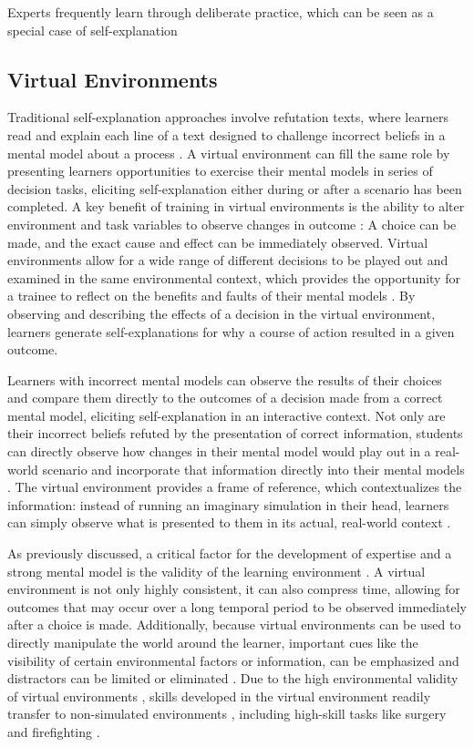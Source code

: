 Experts frequently learn through deliberate practice, which can be seen as a special case of self-explanation

\subsection{Virtual Environments}

Traditional self-explanation approaches involve refutation texts, where learners read and explain each line of a text designed to challenge incorrect beliefs in a mental model about a process \citep{Chi1994}. A virtual environment can fill the same role by presenting learners opportunities to exercise their mental models in series of decision tasks, eliciting self-explanation either during or after a scenario has been completed. A key benefit of training in virtual environments is the ability to alter environment and task variables to observe changes in outcome \citep{Klein2006}: A choice can be made, and the exact cause and effect can be immediately observed. Virtual environments allow for a wide range of different decisions to be played out and examined in the same environmental context, which provides the opportunity for a trainee to reflect on the benefits and faults of their mental models \citep{Salzman1999}. By observing and describing the effects of a decision in the virtual environment, learners generate self-explanations for why a course of action resulted in a given outcome.

Learners with incorrect mental models can observe the results of their choices and compare them directly to the outcomes of a decision made from a correct mental model, eliciting self-explanation in an interactive context. Not only are their incorrect beliefs refuted by the presentation of correct information, students can directly observe how changes in their mental model would play out in a real-world scenario and incorporate that information directly into their mental models \citep{Salzman1999}. The virtual environment provides a frame of reference, which contextualizes the information: instead of running an imaginary simulation in their head, learners can simply observe what is presented to them in its actual, real-world context \citep{Ericsson1993}.

As previously discussed, a critical factor for the development of expertise and a strong mental model is the validity of the learning environment \citep{Klein2006, Kahneman2009}. A virtual environment is not only highly consistent, it can also compress time, allowing for outcomes that may occur over a long temporal period to be observed immediately after a choice is made. Additionally, because virtual environments can be used to directly manipulate the world around the learner, important cues like the visibility of certain environmental factors or information, can be emphasized and distractors can be limited or eliminated \citep{Salzman1999}. Due to the high environmental validity of virtual environments \citep{Loomis1999}, skills developed in the virtual environment readily transfer to non-simulated environments \citep{Cromby1996, Watanuki2007}, including high-skill tasks like surgery \citep{Seymour2002} and firefighting \citep{Bliss1997}.

